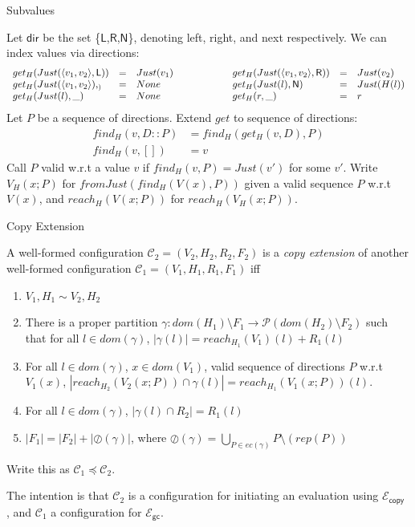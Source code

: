 \documentclass{beamer}
\newcommand{\ms}[1]{\ensuremath{\mathsf{#1}}}
\newcommand{\oh}[1]{\oslash(#1)}
\newcommand{\gcSem}{\ensuremath{\mathcal{E}_{\ms{gc}}}}
\newcommand{\copySem}{\ensuremath{\mathcal{E}_{\ms{copy}}}}
\theoremstyle{definition}
\begin{document}
\begin{frame}{Subvalues}
  \begin{definition}
	Let \ms{dir} be the set \{\ms{L},\ms{R},\ms{N}\}, denoting left, right, and next 
	respectively. We can index values via directions:
        $$
	\begin{array}{lclclcl}
		get_H(Just(\pairexcst{v_1}{v_2},\ms{L})) &=& Just(v_1) & \hspace{4em} &
		get_H(Just(\pairexcst{v_1}{v_2},\ms{R})) &=& Just(v_2)\\
		get_H(Just(\pairexcst{v_1}{v_2}),_) &=& None &&
		get_H(Just(l),\ms{N}) &=& Just(H(l)) \\
		get_H(Just(l), \_) &=& None &&
		get_H(r,\_) &=& r
	\end{array}
        $$
	Let $P$ be a sequence of directions. Extend $get$ to sequence of directions:
	\begin{align*}
		find_H(v,D::P) &= find_H(get_H(v,D),P)\\
		find_H(v,[]) &= v
	\end{align*}
	Call $P$ valid w.r.t a value $v$ if $find_H(v,P) = Just (v')$ for some $v'$.
	Write $V_H(x;P)$ for $fromJust(find_H(V(x),P))$ given a valid sequence $P$ w.r.t $V(x)$,
	and $reach_H(V(x;P))$ for $reach_H(V_H(x;P))$.
\end{definition}
\end{frame}


\begin{frame}{Copy Extension}
\begin{definition}
A well-formed configuration $\mathcal{C}_2 = (V_2,H_2,R_2,F_2)$ is a \emph{copy extension} of another well-formed configuration
$\mathcal{C}_1 = (V_1,H_1,R_1,F_1)$ iff
\begin{enumerate}
\item $V_1,H_1 \sim V_2,H_2$
\item There is a proper partition $\gamma : dom(H_1) \setminus F_1 \to \mathcal{P}(dom(H_2) \setminus F_2)$ 
such that for all $l \in dom(\gamma)$, $|\gamma(l)| = reach_{H_1}(V_1)(l) + R_1(l)$
\item For all $l \in dom(\gamma)$, $x \in dom(V_1)$, valid sequence of directions $P$ w.r.t $V_1(x)$,
	$|reach_{H_2}(V_2(x;P)) \cap \gamma(l)| = reach_{H_1}(V_1(x;P))(l)$.
\item	For all $l \in dom(\gamma)$, $|\gamma(l) \cap R_2| = R_1(l)$
\item $|F_1| = |F_2| + |\oh{\gamma}|$, where 
	$\oh{\gamma} = \bigcup_{P \in ec(\gamma)} P \setminus (rep(P))$
\end{enumerate}
Write this as $\mathcal{C}_1 \preceq \mathcal{C}_2$.
\end{definition} 

The intention is that $\mathcal{C}_2$ is a configuration for initiating an evaluation using \copySem
, and $\mathcal{C}_1$ a configuration for \gcSem. 
\end{frame}
\end{document}
